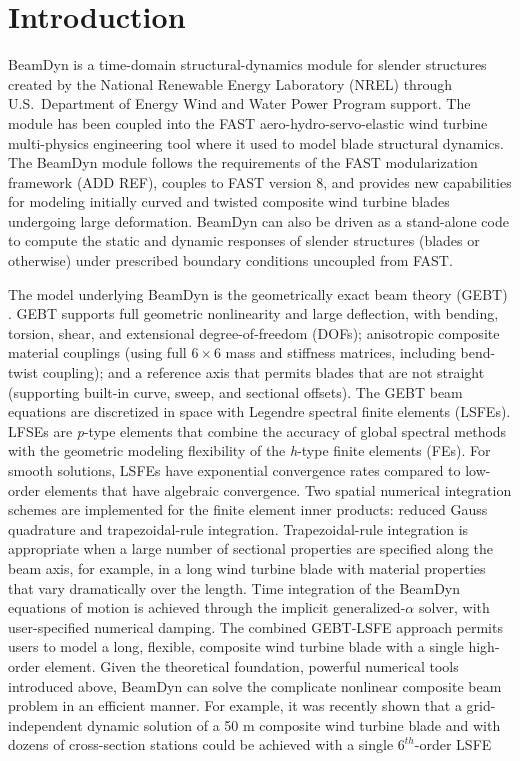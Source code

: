 \chapter{Introduction}
BeamDyn is a time-domain structural-dynamics module for slender structures created by the National Renewable Energy Laboratory (NREL) through U.S.\ Department of Energy Wind and Water Power Program support. 
The module has been coupled into the FAST aero-hydro-servo-elastic wind turbine multi-physics engineering tool where it used to model blade structural dynamics. 
The BeamDyn module follows the requirements of the FAST modularization framework (ADD REF), couples to FAST version 8, and provides new capabilities for modeling initially curved and twisted composite wind turbine blades undergoing large deformation. 
BeamDyn can also be driven as a stand-alone code to compute the static and dynamic responses of slender structures (blades or otherwise) under prescribed boundary conditions uncoupled from FAST.

The model underlying BeamDyn is the geometrically exact beam theory (GEBT) .   
GEBT supports full geometric nonlinearity and large deflection, with bending, torsion, shear, and extensional degree-of-freedom (DOFs); anisotropic composite material couplings (using full $6 \times 6$ mass and stiffness matrices, including bend-twist coupling); and a reference axis that permits blades that are not straight (supporting built-in curve, sweep, and sectional offsets). 
The GEBT beam equations are discretized in space with Legendre spectral finite elements (LSFEs).  
LFSEs are {\it p}-type elements that combine the accuracy of global spectral methods with the geometric modeling flexibility of the {\it h}-type finite elements (FEs). 
For smooth solutions, LSFEs have exponential convergence rates compared to low-order elements that have algebraic convergence. 
Two spatial numerical integration schemes are implemented for the finite element inner products: reduced Gauss quadrature and trapezoidal-rule integration.  
Trapezoidal-rule integration is appropriate when a large number of sectional properties are specified along the beam axis, for example, in a long wind turbine blade with material properties that vary dramatically over the length.  
Time integration of the BeamDyn equations of motion is achieved through the implicit generalized-$\alpha$ solver, with user-specified numerical damping.
The combined GEBT-LSFE  approach permits users to model a long, flexible, composite wind turbine blade with a single high-order element.  
Given the theoretical foundation, powerful numerical tools introduced above, BeamDyn can solve the complicate nonlinear composite beam problem in an efficient manner. For example, it was recently shown that a grid-independent dynamic solution of a 50 m composite wind turbine blade and with dozens of cross-section stations could be achieved with a 
single $6^{th}$-order LSFE 

